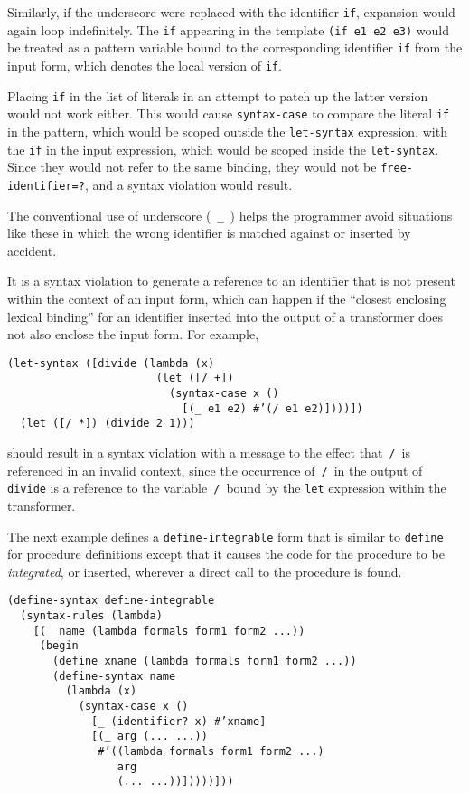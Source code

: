 Similarly, if the underscore were replaced with the identifier
\texttt{if}, expansion would again loop indefinitely.
The \texttt{if} appearing in the template \texttt{(if e1 e2 e3)} would be treated
as a pattern variable bound to the corresponding identifier \texttt{if}
from the input form, which denotes the local version of \texttt{if}.


Placing \texttt{if} in the list of literals in an attempt
to patch up the latter version would not work either.
This would cause \texttt{syntax-case} to compare the literal
\texttt{if} in the pattern, which would be scoped outside the
\texttt{let-syntax} expression, with the \texttt{if} in the
input expression, which would be scoped inside the \texttt{let-syntax}.
Since they would not refer to the same binding, they would not be
\texttt{free-identifier=?}, and a syntax violation would result.


The conventional use of
\label{syntax_s58}\label{syntax_s59}underscore ( \texttt{\_{}} )
helps the programmer avoid situations like these in which the wrong
identifier is matched against or inserted by accident.


It is a syntax violation to generate a reference to an identifier that is not
present within the context of an input form, which can happen if the
``closest enclosing lexical binding'' for an identifier inserted into
the output of a transformer does not also enclose the input form.
For example,


\begin{alltt}
(let-syntax ([divide (lambda (x)
                       (let ([/ +])
                         (syntax-case x ()
                           [(\_{} e1 e2) \#{}'(/ e1 e2)])))])
  (let ([/ *]) (divide 2 1)))
\end{alltt}


should result in a syntax violation with a message to the effect that \texttt{/} is referenced in an
invalid context, since the occurrence of \texttt{/} in the output of
\texttt{divide} is a reference to the variable \texttt{/} bound by the \texttt{let}
expression within the transformer.


\label{syntax_s60}The next example defines a
\label{syntax_s61}\texttt{define-integrable}
form that is similar
to \texttt{define} for procedure definitions except that it causes the
code for the procedure to be \textit{integrated}, or inserted, wherever
a direct call to the procedure is found.


\begin{alltt}
(define-syntax define-integrable
  (syntax-rules (lambda)
    [(\_{} name (lambda formals form1 form2 ...))
     (begin
       (define xname (lambda formals form1 form2 ...))
       (define-syntax name
         (lambda (x)
           (syntax-case x ()
             [\_{} (identifier? x) \#{}'xname]
             [(\_{} arg (... ...))
              \#{}'((lambda formals form1 form2 ...)
                 arg
                 (... ...))]))))]))
\end{alltt}



